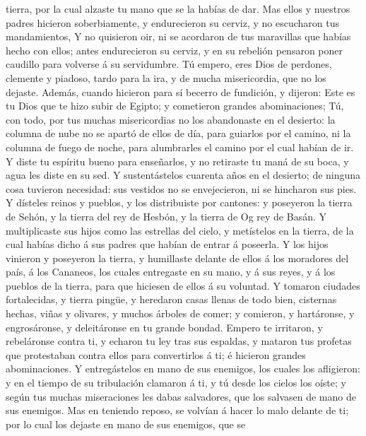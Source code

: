tierra, por la cual alzaste tu mano que se la habías de dar.
 Mas ellos y nuestros padres hicieron soberbiamente, y
endurecieron su cerviz, y no escucharon tus mandamientos, 
Y no quisieron oir, ni se acordaron de tus maravillas que habías hecho
con ellos; antes endurecieron su cerviz, y en su rebelión pensaron poner
caudillo para volverse á su servidumbre. Tú empero, eres Dios de
perdones, clemente y piadoso, tardo para la ira, y de mucha
misericordia, que no los dejaste.  Además, cuando hicieron
para sí becerro de fundición, y dijeron: Este es tu Dios que te hizo
subir de Egipto; y cometieron grandes abominaciones;  Tú,
con todo, por tus muchas misericordias no los abandonaste en el
desierto: la columna de nube no se apartó de ellos de día, para guiarlos
por el camino, ni la columna de fuego de noche, para alumbrarles el
camino por el cual habían de ir.  Y diste tu espíritu bueno
para enseñarlos, y no retiraste tu maná de su boca, y agua les diste en
su sed.  Y sustentástelos cuarenta años en el desierto; de
ninguna cosa tuvieron necesidad: sus vestidos no se envejecieron, ni se
hincharon sus pies.  Y dísteles reinos y pueblos, y los
distribuiste por cantones: y poseyeron la tierra de Sehón, y la tierra
del rey de Hesbón, y la tierra de Og rey de Basán.  Y
multiplicaste sus hijos como las estrellas del cielo, y metístelos en la
tierra, de la cual habías dicho á sus padres que habían de entrar á
poseerla.  Y los hijos vinieron y poseyeron la tierra, y
humillaste delante de ellos á los moradores del país, á los Cananeos,
los cuales entregaste en su mano, y á sus reyes, y á los pueblos de la
tierra, para que hiciesen de ellos á su voluntad.  Y
tomaron ciudades fortalecidas, y tierra pingüe, y heredaron casas llenas
de todo bien, cisternas hechas, viñas y olivares, y muchos árboles de
comer; y comieron, y hartáronse, y engrosáronse, y deleitáronse en tu
grande bondad.  Empero te irritaron, y rebeláronse contra
ti, y echaron tu ley tras sus espaldas, y mataron tus profetas que
protestaban contra ellos para convertirlos á ti; é hicieron grandes
abominaciones.  Y entregástelos en mano de sus enemigos,
los cuales los afligieron: y en el tiempo de su tribulación clamaron á
ti, y tú desde los cielos los oíste; y según tus muchas miseraciones les
dabas salvadores, que los salvasen de mano de sus enemigos.
 Mas en teniendo reposo, se volvían á hacer lo malo delante
de ti; por lo cual los dejaste en mano de sus enemigos, que se
